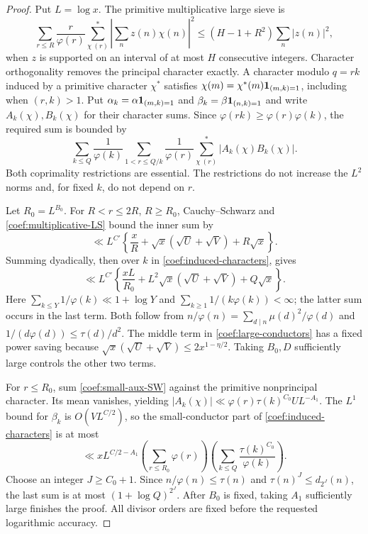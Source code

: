 \begin{proof}
Put $L=\log x$.  The primitive multiplicative large sieve
\cite[Theorem~18.2]{Kedlaya} is
\begin{equation}
 \sum_{r\le R}\frac r{\varphi(r)}\sum_{\chi\ (r)}^{*}
 \left|\sum_nz(n)\chi(n)\right|^2
 \le(H-1+R^2)\sum_n|z(n)|^2,
 \label{coef:multiplicative-LS}
\end{equation}
when $z$ is supported on an interval of at most $H$ consecutive integers.
Character orthogonality removes the principal character exactly.
A character modulo $q=rk$ induced by a primitive character $\chi^*$
satisfies $\chi(m)=\chi^*(m)\mathbf 1_{(m,k)=1}$, including when $(r,k)>1$.
Put $\alpha_k=\alpha\mathbf 1_{(m,k)=1}$ and
$\beta_k=\beta\mathbf 1_{(n,k)=1}$ and write $A_k(\chi),B_k(\chi)$ for
their character sums.  Since $\varphi(rk)\ge\varphi(r)\varphi(k)$,
the required sum is bounded by
\begin{equation}
 \sum_{k\le Q}\frac1{\varphi(k)}
 \sum_{1<r\le Q/k}\frac1{\varphi(r)}
              \sum_{\chi\ (r)}^{*}|A_k(\chi)B_k(\chi)|.
 \label{coef:induced-characters}
\end{equation}
Both coprimality restrictions are essential.  The restrictions do not
increase the $L^2$ norms and, for fixed $k$, do not depend on $r$.

Let $R_0=L^{B_0}$.  For $R<r\le2R$, $R\ge R_0$, Cauchy--Schwarz
and \eqref{coef:multiplicative-LS} bound the inner sum by
\[
 \ll L^{C'}\left\{\frac xR+
 \sqrt x(\sqrt U+\sqrt V)+R\sqrt x\right\}.
\]
Summing dyadically, then over $k$ in
\eqref{coef:induced-characters}, gives
\begin{equation}
 \ll L^{C'}\left\{\frac{xL}{R_0}
       +L^2\sqrt x(\sqrt U+\sqrt V)+Q\sqrt x\right\}.
 \label{coef:large-conductors}
\end{equation}
Here $\sum_{k\le Y}1/\varphi(k)\ll1+\log Y$ and
$\sum_{k\ge1}1/(k\varphi(k))<\infty$; the latter sum occurs in
the last term.  Both follow from
$n/\varphi(n)=\sum_{d\mid n}\mu(d)^2/\varphi(d)$ and
$1/(d\varphi(d))\le\tau(d)/d^2$.
The middle term in \eqref{coef:large-conductors} has a fixed power
saving because $\sqrt x(\sqrt U+\sqrt V)\le2x^{1-\eta/2}$.
Taking $B_0,D$ sufficiently large controls the other two terms.

For $r\le R_0$, sum \eqref{coef:small-aux-SW} against the primitive
nonprincipal character.  Its mean vanishes, yielding
$|A_k(\chi)|\ll\varphi(r)\tau(k)^{C_0}UL^{-A_1}$.
The $L^1$ bound for $\beta_k$ is $O(VL^{C/2})$, so the small-conductor
part of \eqref{coef:induced-characters} is at most
\[
 \ll xL^{C/2-A_1}
       \left(\sum_{r\le R_0}\varphi(r)\right)
       \left(\sum_{k\le Q}\frac{\tau(k)^{C_0}}{\varphi(k)}\right).
\]
Choose an integer $J\ge C_0+1$.  Since
$n/\varphi(n)\le\tau(n)$ and $\tau(n)^J\le d_{2^J}(n)$,
the last sum is at most $(1+\log Q)^{2^J}$.
After $B_0$ is fixed, taking $A_1$ sufficiently large finishes the proof.
All divisor orders are fixed before the requested logarithmic accuracy.
\end{proof}

